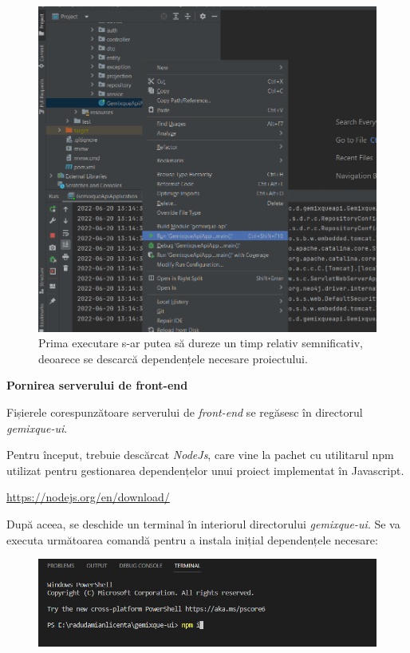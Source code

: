 \documentclass[12pt,a4paper]{report}
\begin{document}
        \begin{figure}[H]
\centering
\caption{}
\begin{adjustbox}{max size={\textwidth}{\textheight}}
\includegraphics[scale=0.6]{exemplu_49_open_backend}
\end{adjustbox}
\caption*{Prima executare s-ar putea să dureze un timp relativ semnificativ, deoarece se descarcă dependențele necesare proiectului.}
\end{figure}

\bigskip
\textbf{Pornirea serverului de front-end}
\bigskip

Fișierele corespunzătoare serverului de \emph{front-end} se regăsesc în directorul \emph{gemixque-ui}.

Pentru început, trebuie descărcat \emph{NodeJs}, care vine la pachet cu utilitarul npm utilizat pentru gestionarea dependențelor unui proiect implementat în Javascript.

\url{https://nodejs.org/en/download/}

După aceea, se deschide un terminal în interiorul directorului \emph{gemixque-ui}. Se va executa următoarea comandă pentru a instala inițial dependențele necesare:

        \begin{figure}[H]
\centering
\caption{}
\begin{adjustbox}{max size={\textwidth}{\textheight}}
\includegraphics[scale=0.8]{exemplu_50_npm}
\end{adjustbox}
\caption*{}
\end{figure}
\end{document}
